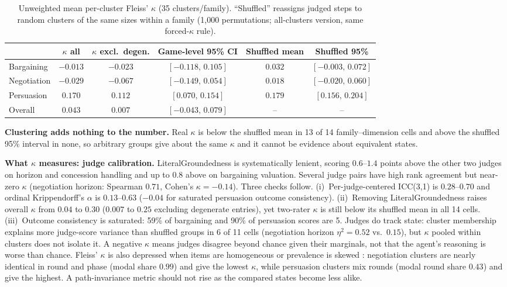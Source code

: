 \documentclass{article}
\begin{document}
\begin{table}[t]
\footnotesize
\centering
\setlength{\tabcolsep}{4pt}
\begin{tabular}{lccccc}
\toprule
 & $\kappa$ all & $\kappa$ excl.\ degen. & Game-level 95\% CI & Shuffled mean & Shuffled 95\% \\
\midrule
Bargaining  & $-0.013$ & $-0.023$ & $[-0.118,\,0.105]$ & $0.032$ & $[-0.003,\,0.072]$ \\
Negotiation & $-0.029$ & $-0.067$ & $[-0.149,\,0.054]$ & $0.018$ & $[-0.020,\,0.060]$ \\
Persuasion  & $0.170$ & $0.112$ & $[0.070,\,0.154]$ & $0.179$ & $[0.156,\,0.204]$ \\
Overall     & $0.043$ & $0.007$ & $[-0.043,\,0.079]$ & -- & -- \\
\bottomrule
\end{tabular}
\caption{Unweighted mean per-cluster Fleiss' $\kappa$ (35 clusters/family). ``Shuffled'' reassigns judged steps to random clusters of the same sizes within a family (1{,}000 permutations; all-clusters version, same forced-$\kappa$ rule).}
\label{tab:headline}
\end{table}

\textbf{Clustering adds nothing to the number.} Real $\kappa$ is below the shuffled mean in 13 of 14 family--dimension cells and above the shuffled 95\% interval in none, so arbitrary groups give about the same $\kappa$ and it cannot be evidence about equivalent states.

\textbf{What $\kappa$ measures: judge calibration.} LiteralGroundedness is systematically lenient, scoring $0.6$--$1.4$ points above the other two judges on horizon and concession handling and up to $0.8$ above on bargaining valuation. Several judge pairs have high rank agreement but near-zero $\kappa$ (negotiation horizon: Spearman $0.71$, Cohen's $\kappa=-0.14$). Three checks follow. (i)~Per-judge-centered ICC(3,1) is $0.28$--$0.70$ and ordinal Krippendorff's $\alpha$ is $0.13$--$0.63$ ($-0.04$ for saturated persuasion outcome consistency). (ii)~Removing LiteralGroundedness raises overall $\kappa$ from $0.04$ to $0.30$ ($0.007$ to $0.25$ excluding degenerate entries), yet two-rater $\kappa$ is still below its shuffled mean in all 14 cells. (iii)~Outcome consistency is saturated: 59\% of bargaining and 90\% of persuasion scores are 5. Judges do track state: cluster membership explains more judge-score variance than shuffled groups in 6 of 11 cells (negotiation horizon $\eta^2=0.52$ vs.\ $0.15$), but $\kappa$ pooled within clusters does not isolate it. A negative $\kappa$ means judges disagree beyond chance given their marginals, not that the agent's reasoning is worse than chance. Fleiss' $\kappa$ is also depressed when items are homogeneous or prevalence is skewed \citep{feinstein1990}: negotiation clusters are nearly identical in round and phase (modal share $0.99$) and give the lowest $\kappa$, while persuasion clusters mix rounds (modal round share $0.43$) and give the highest. A path-invariance metric should not rise as the compared states become less alike.
\end{document}
